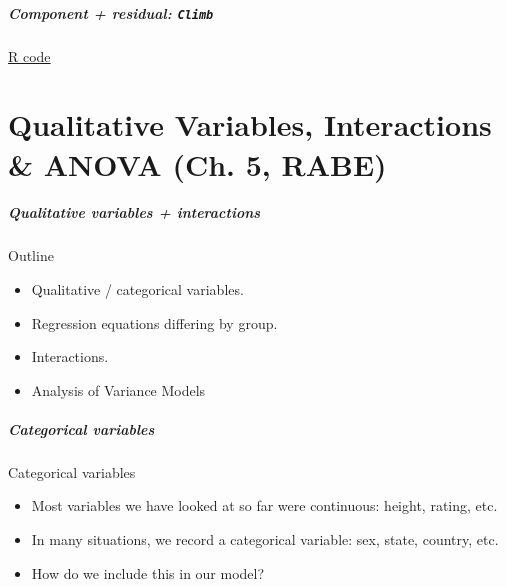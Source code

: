 \documentclass[handout]{beamer}
\begin{document}


   \begin{frame}
   \frametitle{Component + residual: {\tt Climb}}
   \begin{center}
   \end{center}
   \href{http://stats191.stanford.edu/diagnostics.html#component-residual-plots}{R code}
   \end{frame}

   \part{Qualitative Variables, Interactions \& ANOVA  (Ch. 5, RABE)}
   \frame{\partpage}


   \begin{frame} \frametitle{Qualitative variables + interactions}

   \begin{block}
   {Outline}
   \begin{itemize}

   \item Qualitative / categorical variables.

   \item Regression equations differing by group.

   \item Interactions.

   \item Analysis of Variance Models

   \end{itemize}
   \end{block}
   \end{frame}


   \begin{frame} \frametitle{Categorical variables}

   \begin{block}
   {Categorical variables}
   \begin{itemize}

   \item       Most variables we have looked at so far
   were continuous: height, rating, etc.

   \item In many situations, we record a categorical variable:
   sex, state, country, etc.

   \item How do we include this in our model?
   \end{itemize}
   \end{block}
   \end{frame}
\end{document}
